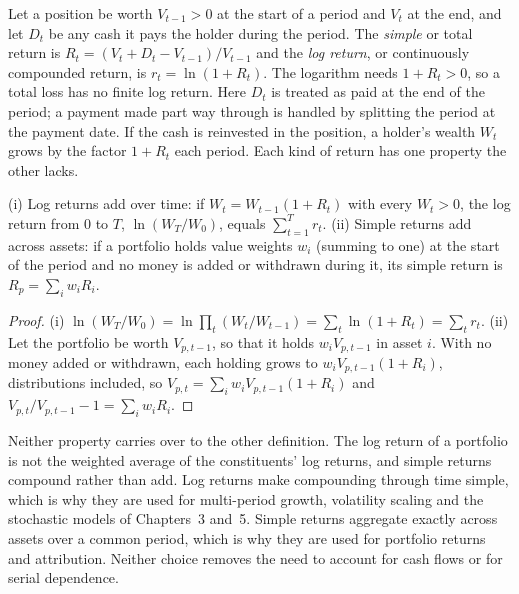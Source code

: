 \begin{chapterrefs}
Let a position be worth $V_{t-1}>0$ at the start of a period and $V_t$ at the end, and let $D_t$ be
any cash it pays the holder during the period. The \emph{simple} or total return is
$R_t = (V_t+D_t-V_{t-1})/V_{t-1}$ and the \emph{log return}, or continuously compounded return, is
$r_t = \ln(1+R_t)$. The logarithm needs $1+R_t>0$, so a total loss has no finite log return. Here $D_t$ is treated as paid at the end of the period; a payment made part way
through is handled by splitting the period at the payment date. If the cash is reinvested in the
position, a holder's wealth $W_t$ grows by the factor $1+R_t$ each period. Each kind of return has one property the other lacks.

\begin{proposition}\label{prop:additivity}
(i) Log returns add over time: if $W_t = W_{t-1}(1+R_t)$ with every $W_t>0$, the log return from $0$
to $T$, $\ln(W_T/W_0)$, equals $\sum_{t=1}^T r_t$.
(ii) Simple returns add across assets: if a portfolio holds value weights $w_i$ (summing to one) at
the start of the period and no money is added or withdrawn during it, its simple return is
$R_p = \sum_i w_i R_i$.
\end{proposition}
\begin{proof}
(i) $\ln(W_T/W_0) = \ln\prod_{t}(W_t/W_{t-1}) = \sum_t \ln(1+R_t) = \sum_t r_t$. (ii) Let the portfolio
be worth $V_{p,t-1}$, so that it holds $w_iV_{p,t-1}$ in asset $i$. With no money added or withdrawn,
each holding grows to $w_iV_{p,t-1}(1+R_i)$, distributions included, so
$V_{p,t} = \sum_i w_i V_{p,t-1}(1+R_i)$ and $V_{p,t}/V_{p,t-1}-1 = \sum_i w_i R_i$.
\end{proof}

Neither property carries over to the other definition. The log return of a portfolio is not the
weighted average of the constituents' log returns, and simple returns compound rather than add. Log
returns make compounding through time simple, which is why they are used for multi-period growth,
volatility scaling and the stochastic models of Chapters~3 and~5. Simple returns aggregate exactly
across assets over a common period, which is why they are used for portfolio returns and
attribution. Neither choice removes the need to account for cash flows or for serial dependence.


\end{chapterrefs}
